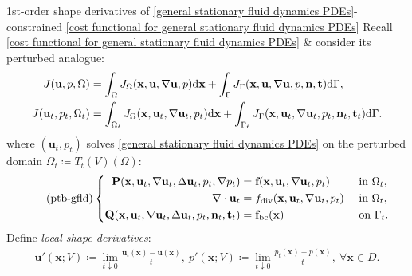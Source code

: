 \documentclass[10pt
hyperref={
    pdfauthor={Hong Quan Ba Nguyen},
    pdftitle={Optimal Shape Design of Air Ducts in Combustion Engines: Design a General Framework},
    pdfsubject={Talk},
    pdfcreator={LaTeX},
}
]{beamer}
\begin{document}
\begin{frame}{1st-order shape derivatives of \eqref{general stationary fluid dynamics PDEs}-constrained \eqref{cost functional for general stationary fluid dynamics PDEs}}
    \vspace{2mm}
    Recall \eqref{cost functional for general stationary fluid dynamics PDEs} {\small\&} consider its perturbed analogue:
    \begin{align*}
        J(\textbf{u},p,\Omega) &= \int_\Omega J_\Omega(\textbf{x},\textbf{u},\nabla\textbf{u},p){\rm d}\textbf{x} + \int_\Gamma J_\Gamma(\textbf{x},\textbf{u},\nabla\textbf{u},p,\textbf{n},\textbf{t}){\rm d}\Gamma,\\
        J(\textbf{u}_t,p_t,\Omega_t) &= \int_{\Omega_t} J_\Omega(\textbf{x},\textbf{u}_t,\nabla\textbf{u}_t,p_t){\rm d}\textbf{x} + \int_{\Gamma_t} J_\Gamma(\textbf{x},\textbf{u}_t,\nabla\textbf{u}_t,p_t,\textbf{n}_t,\textbf{t}_t){\rm d}\Gamma.
    \end{align*}
    where $(\textbf{u}_t,p_t)$ solves \eqref{general stationary fluid dynamics PDEs} on the perturbed domain $\Omega_t\coloneqq T_t(V)(\Omega)$:
    \begin{equation}
        \label{perturbed general stationary fluid dynamics PDEs}
        \tag{ptb-gfld}
        \left\{\begin{split}
            \textbf{P}(\textbf{x},\textbf{u}_t,\nabla\textbf{u}_t,\Delta\textbf{u}_t,p_t,\nabla p_t) &= \textbf{f}(\textbf{x},\textbf{u}_t,\nabla\textbf{u}_t,p_t) &&\mbox{ in } \Omega_t,\\
            -\nabla\cdot\textbf{u}_t &= f_{\rm div}(\textbf{x},\textbf{u}_t,\nabla\textbf{u}_t,p_t) &&\mbox{ in } \Omega_t,\\
            \textbf{Q}(\textbf{x},\textbf{u}_t,\nabla\textbf{u}_t,\Delta\textbf{u}_t,p_t,\textbf{n}_t,\textbf{t}_t) &= \textbf{f}_{\rm bc}(\textbf{x}) &&\mbox{ on } \Gamma_t.
        \end{split}\right.
    \end{equation}
    Define \textit{local shape derivatives}:
    \begin{align*}
        \textbf{u}'(\textbf{x};V)\coloneqq\lim_{t\downarrow 0} \frac{\textbf{u}_t(\textbf{x}) - \textbf{u}(\textbf{x})}{t},\ p'(\textbf{x};V)\coloneqq\lim_{t\downarrow 0} \frac{p_t(\textbf{x}) - p(\textbf{x})}{t},\ \forall\textbf{x}\in D.
    \end{align*}
\end{frame}
\end{document}

